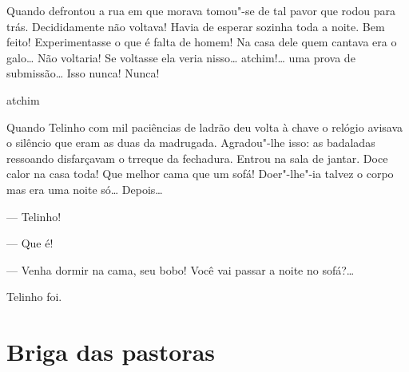 \begin{linenumbers}
Quando defrontou a rua em que morava tomou"-se de tal pavor que rodou
para trás. Decididamente não voltava! Havia de esperar sozinha toda a
noite. Bem feito! Experimentasse o que é falta de homem! Na casa dele
quem cantava era o galo\ldots{} Não voltaria! Se voltasse ela veria nisso\ldots{}
atchim!\ldots{} uma prova de submissão\ldots{} Isso nunca!
Nunca!\dotfill{}

\noindent{}\dotfill{}

\noindent{}\dotfill{}atchim\dotfill{}

\noindent{}\dotfill{}

Quando Telinho com mil paciências de ladrão deu volta à chave o relógio
avisava o silêncio que eram as duas da madrugada. Agradou"-lhe isso: as
badaladas ressoando disfarçavam o trreque da fechadura. Entrou na sala
de jantar. Doce calor na casa toda! Que melhor cama que um sofá!
Doer"-lhe"-ia talvez o corpo mas era uma noite só\ldots{} Depois\ldots{}

--- Telinho!

--- Que é!

--- Venha dormir na cama, seu bobo! Você vai passar a noite no
sofá?\ldots{}

Telinho foi.
\end{linenumbers}

\chapter{Briga das pastoras}

